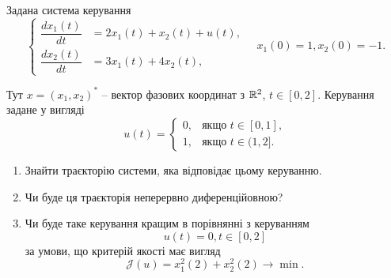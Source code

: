 \begin{problem}
	Задана система керування 
	\[
		\left\{
			\begin{aligned}
				\dfrac{dx_1(t)}{dt} &= 2x_1(t) + x_2(t) + u(t), \\
				\dfrac{dx_2(t)}{dt} &= 3x_1(t) + 4x_2(t),
			\end{aligned}
		\right.
		\quad
		x_1(0) = 1, x_2(0) = -1.
	\]

	Тут $x = (x_1, x_2)^*$ -- вектор фазових координат з $\mathbb{R}^2$, $t \in [0, 2]$. Керування задане у вигляді
	\[
		u(t) 
		=
		\begin{cases}
			0, & \text{якщо } t \in [0, 1], \\
			1, & \text{якщо } t \in (1, 2].
		\end{cases}
	\]
	
	\begin{enumerate}
		\item Знайти траєкторію системи, яка відповідає цьому керуванню.
		\item Чи буде ця траєкторія неперервно диференційовною?
		\item Чи буде таке керування кращим в порівнянні з керуванням 
		\[
			u(t) = 0, t \in [0, 2]
		\]
		за умови, що критерій якості має вигляд 
		\[
			\mathcal{J}(u) = x_1^2(2) + x_2^2(2) \to \min.
		\]
	\end{enumerate}
\end{problem}

